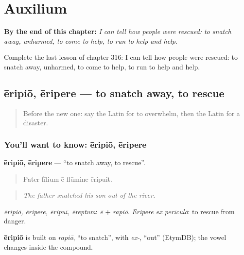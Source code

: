 
\chapter{Auxilium}
\label{ch:la-auxilium}

\begin{chapteropening}
\textbf{By the end of this chapter:} \emph{I can tell how people were rescued: to snatch away, unharmed, to come to help, to run to help and help.}

Complete the last lesson of chapter 316: I can tell how people were rescued: to snatch away, unharmed, to come to help, to run to help and help.
\end{chapteropening}

\section[ēripiō, ēripere]{ēripiō, ēripere — to snatch away, to rescue}

\label{lesson:LA-C316-eripio}



\begin{quote}
Before the new one: say the Latin for to overwhelm, then the Latin for a disaster.
\end{quote}

\subsection*{You'll want to know: ēripiō, ēripere}
\textbf{ēripiō, ēripere} — \textquotedblleft{}to snatch away, to rescue\textquotedblright{}.

\begin{quote}
Pater fīlium ē flūmine ēripuit.
\end{quote}

\begin{quote}
\emph{The father snatched his son out of the river.}
\end{quote}

\emph{ēripiō, ēripere, ēripuī, ēreptum}: \emph{ē} + \emph{rapiō}. \emph{Ēripere ex perīculō}: to rescue from danger.

\begin{cousinweb}
\textbf{ēripiō} is built on \emph{rapiō}, \textquotedblleft{}to snatch\textquotedblright{}, with \emph{ex-}, \textquotedblleft{}out\textquotedblright{} (EtymDB); the vowel changes inside the compound.
\end{cousinweb}

